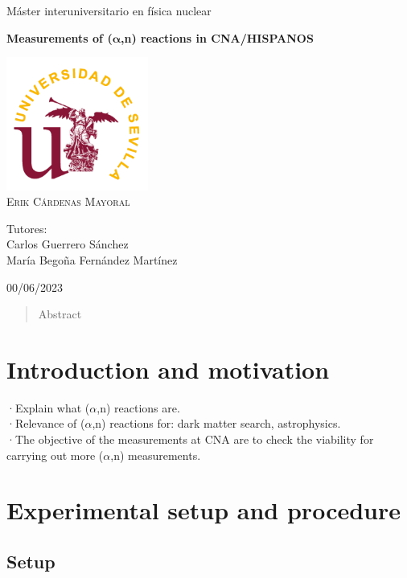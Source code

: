 \documentclass[a4paper,12pt]{report}
\newcommand{\an}{($\alpha$,n) }
\begin{document}
\begin{titlepage}
	\centering
	\Huge Máster interuniversitario en física nuclear\par
	\vspace*{3cm}
	\HUGE \textbf{Measurements of ($\bm{\alpha}$,n) reactions in CNA/HISPANOS}\par	%
	\vspace{1cm}
	\includegraphics[width=0.35\textwidth]{us.png}\\
	\vspace{1cm}
	\Large \textsc{Erik Cárdenas Mayoral}\par
	\vspace{2cm}
	Tutores:\\
	Carlos Guerrero Sánchez\\
	María Begoña Fernández Martínez\par
	\vfill
	00/06/2023
\end{titlepage}

\begin{abstract}
Abstract
\end{abstract}

\tableofcontents

\chapter{Introduction and motivation}
·Explain what \an reactions are.\\

·Relevance of \an reactions for: dark matter search, astrophysics.\\

·The objective of the measurements at CNA are to check the viability for carrying out more \an measurements.\\


\chapter{Experimental setup and procedure}
\section{Setup}
\end{document}
